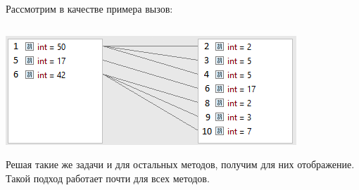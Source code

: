 \begin{frame}
\frametitle{\insertsection} 
\framesubtitle{\insertsubsection}
Рассмотрим в качестве примера вызов:
\inputminted{java}{code/FlatMapFactorizeExample.java}
\includegraphics[scale=0.8]{img/flatMapExample.png}

Решая такие же задачи и для остальных методов, получим для них отображение. Такой подход работает почти для всех методов.
\end{frame}
